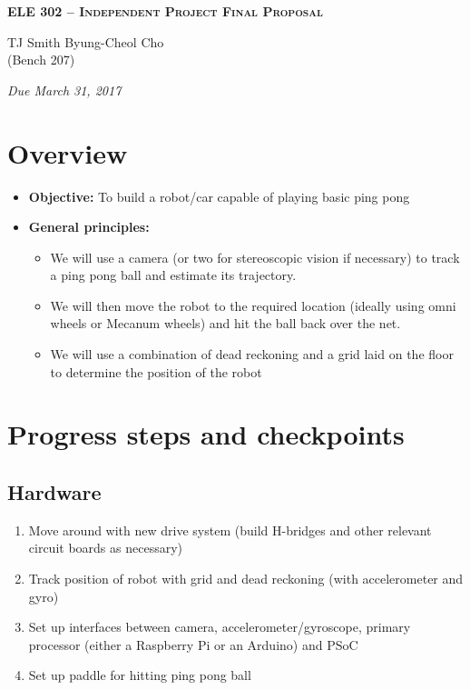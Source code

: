 \documentclass[letterpaper, 11pt]{article}
\begin{document}
    \begin{center}
        \large
        \textsc{\textbf{ELE 302 -- Independent Project Final Proposal}} \vspace{5pt}

        \normalsize
        TJ Smith \hspace{1cm} Byung-Cheol Cho \\
        (Bench 207) \vspace{5pt}

        \emph{Due March 31, 2017}
        \normalsize
    \end{center}

\section{Overview}
\begin{itemize}
    \item \textbf{Objective:} To build a robot/car capable of playing basic ping pong
    \item \textbf{General principles:}
        \begin{itemize}
            \item We will use a camera (or two for stereoscopic vision if necessary) to track a ping pong ball and estimate its trajectory.
            \item We will then move the robot to the required location (ideally using omni wheels or Mecanum wheels) and hit the ball back over the net.
            \item We will use a combination of dead reckoning and a grid laid on the floor to determine the position of the robot
        \end{itemize}
\end{itemize}

\section{Progress steps and checkpoints}
\subsection*{Hardware}
\begin{enumerate}[label=\textbf{(\arabic*)}]
    \item Move around with new drive system (build H-bridges and other relevant circuit boards as necessary)
    \item Track position of robot with grid and dead reckoning (with accelerometer and gyro)
    \item Set up interfaces between camera, accelerometer/gyroscope, primary processor (either a Raspberry Pi or an Arduino) and PSoC
    \item Set up paddle for hitting ping pong ball
\end{enumerate}
\end{document}
